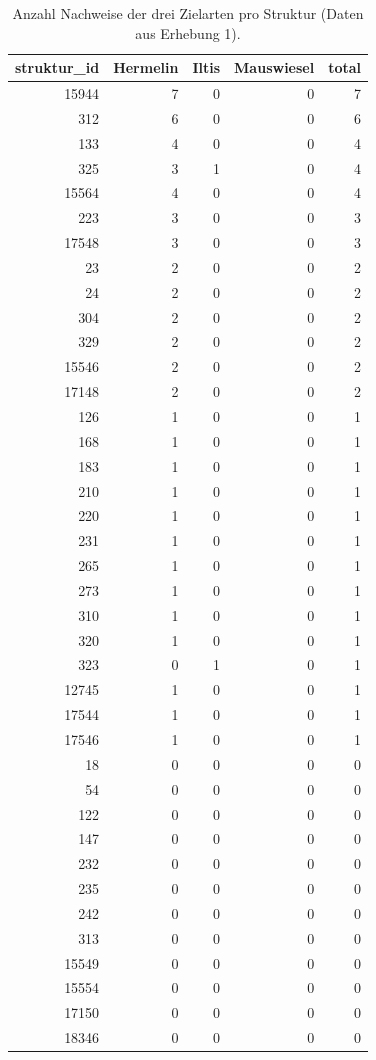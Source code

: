 \documentclass[
  oneside]{scrbook}
\begin{document}
\begin{table}

\caption{\label{tab:unnamed-chunk-17}Anzahl Nachweise der drei Zielarten pro Struktur (Daten aus Erhebung 1).}
\centering
\begin{tabular}[t]{r|r|r|r|r}
\hline
struktur\_id & Hermelin & Iltis & Mauswiesel & total\\
\hline
15944 & 7 & 0 & 0 & 7\\
\hline
312 & 6 & 0 & 0 & 6\\
\hline
133 & 4 & 0 & 0 & 4\\
\hline
325 & 3 & 1 & 0 & 4\\
\hline
15564 & 4 & 0 & 0 & 4\\
\hline
223 & 3 & 0 & 0 & 3\\
\hline
17548 & 3 & 0 & 0 & 3\\
\hline
23 & 2 & 0 & 0 & 2\\
\hline
24 & 2 & 0 & 0 & 2\\
\hline
304 & 2 & 0 & 0 & 2\\
\hline
329 & 2 & 0 & 0 & 2\\
\hline
15546 & 2 & 0 & 0 & 2\\
\hline
17148 & 2 & 0 & 0 & 2\\
\hline
126 & 1 & 0 & 0 & 1\\
\hline
168 & 1 & 0 & 0 & 1\\
\hline
183 & 1 & 0 & 0 & 1\\
\hline
210 & 1 & 0 & 0 & 1\\
\hline
220 & 1 & 0 & 0 & 1\\
\hline
231 & 1 & 0 & 0 & 1\\
\hline
265 & 1 & 0 & 0 & 1\\
\hline
273 & 1 & 0 & 0 & 1\\
\hline
310 & 1 & 0 & 0 & 1\\
\hline
320 & 1 & 0 & 0 & 1\\
\hline
323 & 0 & 1 & 0 & 1\\
\hline
12745 & 1 & 0 & 0 & 1\\
\hline
17544 & 1 & 0 & 0 & 1\\
\hline
17546 & 1 & 0 & 0 & 1\\
\hline
18 & 0 & 0 & 0 & 0\\
\hline
54 & 0 & 0 & 0 & 0\\
\hline
122 & 0 & 0 & 0 & 0\\
\hline
147 & 0 & 0 & 0 & 0\\
\hline
232 & 0 & 0 & 0 & 0\\
\hline
235 & 0 & 0 & 0 & 0\\
\hline
242 & 0 & 0 & 0 & 0\\
\hline
313 & 0 & 0 & 0 & 0\\
\hline
15549 & 0 & 0 & 0 & 0\\
\hline
15554 & 0 & 0 & 0 & 0\\
\hline
17150 & 0 & 0 & 0 & 0\\
\hline
18346 & 0 & 0 & 0 & 0\\
\hline
\end{tabular}
\end{table}
\end{document}
